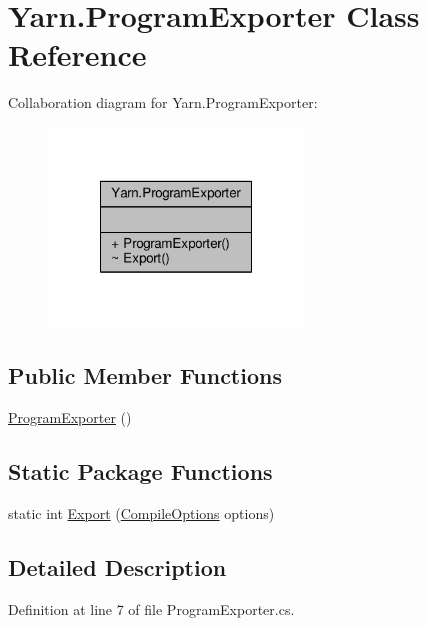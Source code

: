 \hypertarget{a00147}{\section{Yarn.\-Program\-Exporter Class Reference}
\label{a00147}
}


Collaboration diagram for Yarn.\-Program\-Exporter\-:
\nopagebreak
\begin{figure}[H]
\begin{center}
\leavevmode
\includegraphics[width=192pt]{a00749}
\end{center}
\end{figure}
\subsection*{Public Member Functions}
\begin{DoxyCompactItemize}
\item 
\hyperlink{a00147_a2e617f0d69a4a6a1c5307af390067079}{Program\-Exporter} ()
\end{DoxyCompactItemize}
\subsection*{Static Package Functions}
\begin{DoxyCompactItemize}
\item 
static int \hyperlink{a00147_a3679a1f144471ea411fed34f6a79a18d}{Export} (\hyperlink{a00049}{Compile\-Options} options)
\end{DoxyCompactItemize}


\subsection{Detailed Description}


Definition at line 7 of file Program\-Exporter.\-cs.



